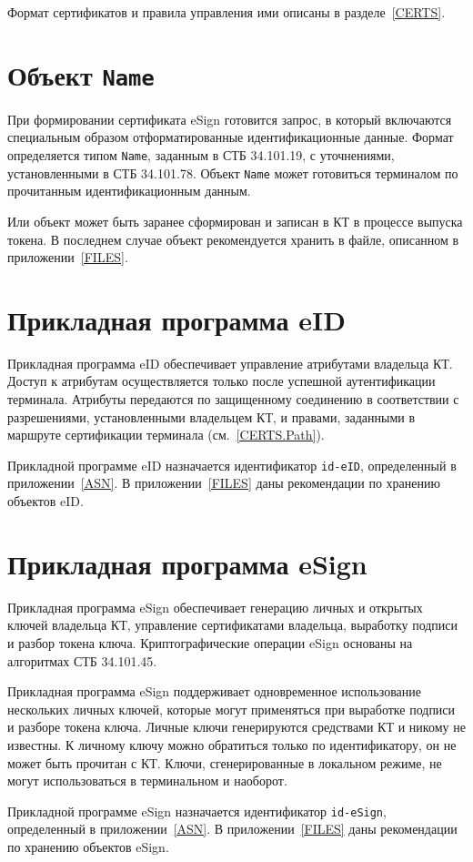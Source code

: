
Формат сертификатов и правила управления ими описаны в разделе~\ref{CERTS}.

\section{Объект \texttt{Name}}\label{OBJ.Name}

При формировании сертификата eSign готовится запрос, в который включаются 
специальным образом отформатированные идентификационные данные. Формат 
определяется типом \texttt{Name}, заданным в СТБ 34.101.19, 
с уточнениями, установленными в СТБ 34.101.78. Объект \texttt{Name}
может готовиться терминалом по прочитанным идентификационным данным.

Или объект может быть заранее сформирован и записан в КТ в процессе выпуска 
токена. В последнем случае объект рекомендуется хранить в файле,
описанном в приложении~\ref{FILES}.

\section{Прикладная программа eID}\label{OBJ.eID}

Прикладная программа eID обеспечивает управление атрибутами владельца КТ. 
Доступ к атрибутам осуществляется только после успешной аутентификации 
терминала. Атрибуты передаются по защищенному соединению в соответствии с 
разрешениями, установленными владельцем КТ, и правами, заданными в маршруте 
сертификации терминала (см.~\ref{CERTS.Path}).  

Прикладной программе eID назначается идентификатор \verb|id-eID|, 
определенный в приложении~\ref{ASN}. В приложении~\ref{FILES}
даны рекомендации по хранению объектов eID.

\section{Прикладная программа eSign}\label{OBJ.eSign}

Прикладная программа eSign обеспечивает генерацию личных и открытых 
ключей владельца КТ, управление сертификатами владельца, 
выработку подписи и разбор токена ключа.
%
Криптографические операции eSign основаны на алгоритмах СТБ 34.101.45.


Прикладная программа eSign поддерживает одновременное 
использование нескольких личных ключей, 
которые могут применяться при выработке подписи и разборе токена ключа.
Личные ключи генерируются средствами КТ и никому не известны. 
К личному ключу можно обратиться только по идентификатору, 
он не может быть прочитан с КТ. 
Ключи, сгенерированные в локальном режиме, не могут использоваться 
в терминальном и наоборот.
\fi

Прикладной программе eSign назначается идентификатор \verb|id-eSign|, 
определенный в приложении~\ref{ASN}. В приложении~\ref{FILES}
даны рекомендации по хранению объектов eSign.


